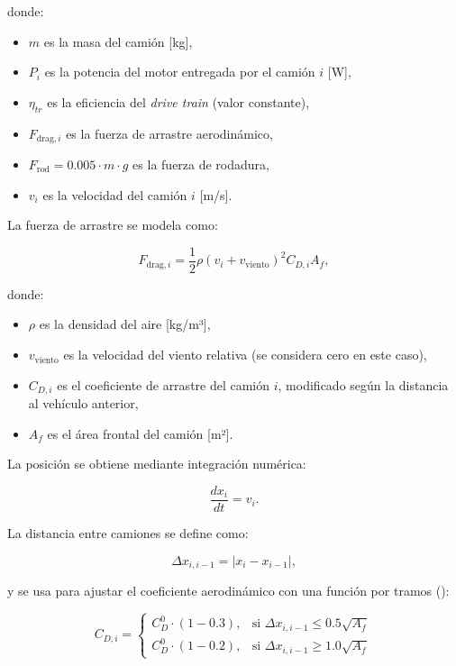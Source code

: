 \documentclass[11pt,stdletter,orderfromtodate,sigleft,twoside]{report}
\begin{document}
donde:

\begin{itemize}
    \item $m$ es la masa del camión [kg],
    \item $P_i$ es la potencia del motor entregada por el camión $i$ [W],
    \item $\eta_{tr}$ es la eficiencia del \textit{drive train} (valor constante),
    \item $F_{\text{drag},i}$ es la fuerza de arrastre aerodinámico,
    \item $F_{\text{rod}} = 0.005 \cdot m \cdot g$ es la fuerza de rodadura,
    \item $v_i$ es la velocidad del camión $i$ [m/s].
\end{itemize}

La fuerza de arrastre se modela como:

\begin{equation}
    F_{\text{drag},i} = \frac{1}{2} \rho \left(v_i + v_{\text{viento}}\right)^2 C_{D,i} A_f,
\end{equation}

donde:

\begin{itemize}
    \item $\rho$ es la densidad del aire [kg/m³],
    \item $v_{\text{viento}}$ es la velocidad del viento relativa (se considera cero en este caso),
    \item $C_{D,i}$ es el coeficiente de arrastre del camión $i$, modificado según la distancia al vehículo anterior,
    \item $A_f$ es el área frontal del camión [m²].
\end{itemize}

La posición se obtiene mediante integración numérica:

\begin{equation}
    \frac{dx_i}{dt} = v_i.
\end{equation}

La distancia entre camiones se define como:

\begin{equation}
    \Delta x_{i,i-1} = |x_i - x_{i-1}|,
\end{equation}

y se usa para ajustar el coeficiente aerodinámico con una función por tramos (\cite{cdREduction}):

\begin{equation}
    C_{D,i} =
    \begin{cases}
        C_D^0 \cdot (1 - 0.3), & \text{si } \Delta x_{i,i-1} \leq 0.5 \sqrt{A_f} \\
        C_D^0 \cdot (1 - 0.2), & \text{si } \Delta x_{i,i-1} \geq 1.0 \sqrt{A_f} 
    \end{cases}
\end{equation}
\end{document}
